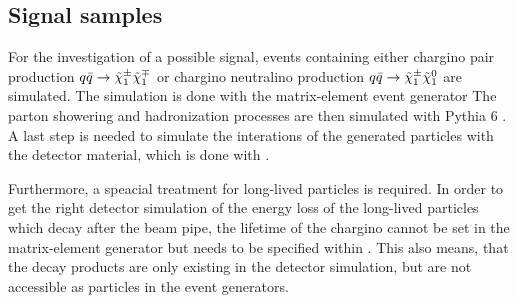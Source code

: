 
\subsection{Signal samples}
\label{sec:SignalSamples}
For the investigation of a possible signal, events containing either chargino pair production $q\bar{q} \rightarrow \tilde{\chi}^{\pm}_{1} \tilde{\chi}^{\mp}_{1}$ or chargino neutralino production $q\bar{q} \rightarrow \tilde{\chi}^{\pm}_{1} \tilde{\chi}^{0}_{1}$ are simulated. 
The simulation is done with the matrix-element event generator \madgraph \cite{bib:Madgraph_2014}
The parton showering and hadronization processes are then simulated with Pythia 6 \cite{bib:Pyhtia6_2006}.
A last step is needed to simulate the interations of the generated particles with the detector material, which is done with \geant \cite{bib:Geant4_2003,bib:Geant4_2006}.

Furthermore, a speacial treatment for long-lived particles is required.
In order to get the right detector simulation of the energy loss of the long-lived particles which decay after the beam pipe, the lifetime of the chargino cannot be set in the matrix-element generator but needs to be specified within \geant.
This also means, that the decay products are only existing in the detector simulation, but are not accessible as particles in the event generators.


